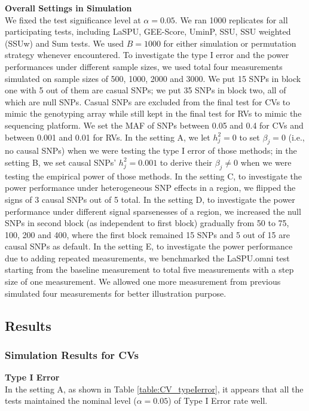 \documentclass[12pt]{article}
\begin{document}
\textbf{Overall Settings in Simulation}\\
We fixed the test significance level at $\alpha = 0.05$. We ran 1000 replicates for all participating tests, including LaSPU, GEE-Score, UminP, SSU, SSU weighted (SSUw) and Sum tests. We used $B = 1000$ for either simulation or permutation strategy whenever encountered. To investigate the type I error and the power performances under different sample sizes, we used total four measurements simulated on sample sizes of 500, 1000, 2000 and 3000. We put 15 SNPs in block one with 5 out of them are casual SNPs; we put 35 SNPs in block two, all of which are null SNPs. Casual SNPs are excluded from the final test for CVs to mimic the genotyping array while still kept in the final test for RVs to mimic the sequencing platform. We set the MAF of SNPs between 0.05 and 0.4 for CVs and between 0.001 and 0.01 for RVs. In the setting A, we let $h_j^2 = 0$ to set $\beta_j = 0$ (i.e., no causal SNPs) when we were testing the type I error of those methods; in the setting B, we set causal SNPs' $h_j^2 = 0.001$ to derive their $\beta_j \neq 0$ when we were testing the empirical power of those methods. In the setting C, to investigate the power performance under heterogeneous SNP effects in a region, we flipped the signs of 3 causal SNPs out of 5 total. In the setting D, to investigate the power performance under different signal sparsenesses of a region, we increased the null SNPs in second block (as independent to first block) gradually from 50 to 75, 100, 200 and 400, where the first block remained 15 SNPs and 5 out of 15 are causal SNPs as default. In the setting E, to investigate the power performance due to adding repeated measurements, we benchmarked the LaSPU.omni test starting from the baseline measurement to total five measurements with a step size of one measurement. We allowed one more measurement from previous simulated four measurements for better illustration purpose.
\subsection{Results}
\subsubsection{Simulation Results for CVs}
\textbf{Type I Error}\\
In the setting A, as shown in Table \ref{table:CV_typeIerror}, it appears that all the tests maintained the nominal level ($\alpha = 0.05$) of Type I Error rate well.
\end{document}
